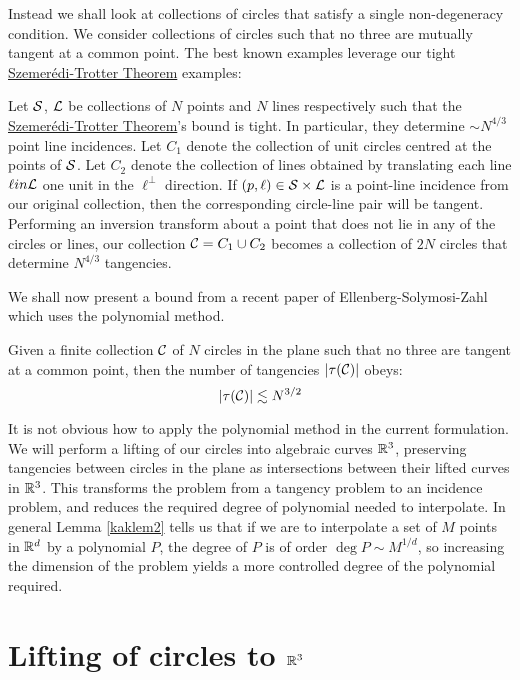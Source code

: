 Instead we shall look at collections of circles that satisfy a single non-degeneracy condition. We consider collections of circles 
such that no three are mutually tangent at a common point. The best known examples leverage our tight \hyperref[thm:S-T]{Szemerédi-Trotter Theorem} examples:
\begin{example}
    Let $\mathcal S$, $\mathcal L$ be collections of $N$ points and $N$ lines respectively such that the \hyperref[thm:S-T]{Szemerédi-Trotter Theorem}'s bound is tight. 
    In particular, they determine $\sim N^{4/3}$ point line incidences. 
    Let $C_1$ denote the collection of unit circles centred at the points of $\mathcal S$. 
    Let $C_2$ denote the collection of lines obtained by translating each line $\ell in \mathcal L$ one unit in the $\ell^{\perp}$ direction.
    If $(p,\ell) \in \mathcal S \times \mathcal L$ is a point-line incidence from our original collection, then the corresponding circle-line pair will be tangent.
    Performing an inversion transform about a point that does not lie in any of the circles or lines, our collection $\mathcal C = C_1 \cup C_2$ becomes a 
    collection of $2N$ circles that determine $N^{4/3}$ tangencies.
 \end{example}

We shall now present a bound from a recent paper of Ellenberg-Solymosi-Zahl which uses the polynomial method.\cite{ellenberg2016new}

\begin{theorem}
    Given a finite collection $\mathcal C$ of $N$ circles in the plane such that no three are tangent at a common point, 
    then the number of tangencies $|\tau(\mathcal C)|$ obeys:
    \[
        |\tau(\mathcal C)| \lesssim N^{3/2}
    \]
    \label{thm:circle-tangencies}
\end{theorem}

It is not obvious how to apply the polynomial method in the current formulation. 
We will perform a lifting  of our circles into algebraic curves $\mathbb R^3$, 
preserving tangencies between circles in the plane as intersections between their lifted curves in $\mathbb R^3$. 
This transforms the problem from a tangency problem to an incidence problem, and reduces the required degree of polynomial needed to interpolate.
In general Lemma \ref{kaklem2} tells us that if we are to interpolate a set of $M$ points in $\mathbb R^d$ by a polynomial $P$, the degree of $P$ is of order $\deg P \sim M^{1/d}$, 
so increasing the dimension of the problem yields a more controlled degree of the polynomial required.

\section{Lifting of circles to $\mathbb R^3$}

